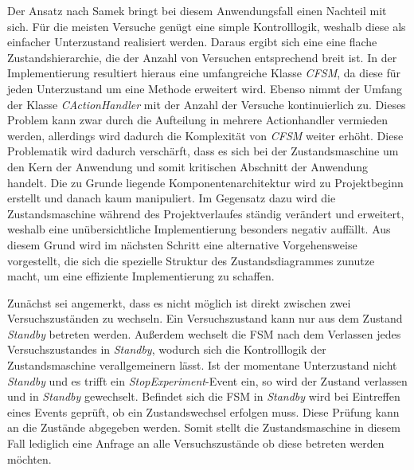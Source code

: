 Der Ansatz nach Samek bringt bei diesem Anwendungsfall einen Nachteil mit sich. Für die meisten Versuche genügt eine simple Kontrolllogik, weshalb diese als einfacher Unterzustand realisiert werden. Daraus ergibt sich eine eine flache Zustandshierarchie, die der Anzahl von Versuchen entsprechend breit ist. In der Implementierung resultiert hieraus eine umfangreiche Klasse \textit{CFSM}, da diese für jeden Unterzustand um eine Methode erweitert wird. Ebenso nimmt der Umfang der Klasse \textit{CActionHandler} mit der Anzahl der Versuche kontinuierlich zu. Dieses Problem kann zwar durch die Aufteilung in mehrere Actionhandler vermieden werden, allerdings wird dadurch die Komplexität von \textit{CFSM} weiter erhöht. Diese Problematik wird dadurch verschärft, dass es sich bei der Zustandsmaschine um den Kern der Anwendung und somit kritischen Abschnitt der Anwendung handelt. Die zu Grunde liegende Komponentenarchitektur wird zu Projektbeginn erstellt und danach kaum manipuliert. Im Gegensatz dazu wird die Zustandsmaschine während des Projektverlaufes ständig verändert und erweitert, weshalb eine unübersichtliche Implementierung besonders negativ auffällt. Aus diesem Grund wird im nächsten Schritt eine alternative Vorgehensweise vorgestellt, die sich die spezielle Struktur des Zustandsdiagrammes zunutze macht, um eine effiziente Implementierung zu schaffen.

Zunächst sei angemerkt, dass es nicht möglich ist direkt zwischen zwei Versuchszuständen zu wechseln. Ein Versuchszustand kann nur aus dem Zustand \textit{Standby} betreten werden. Außerdem wechselt die FSM nach dem Verlassen jedes Versuchszustandes in \textit{Standby}, wodurch sich die Kontrolllogik der Zustandsmaschine verallgemeinern lässt. Ist der momentane Unterzustand nicht \textit{Standby} und es trifft ein \textit{StopExperiment}-Event ein, so wird der Zustand verlassen und in \textit{Standby} gewechselt. Befindet sich die FSM in \textit{Standby} wird bei Eintreffen eines Events geprüft, ob ein Zustandswechsel erfolgen muss. Diese Prüfung kann an die Zustände abgegeben werden. Somit stellt die Zustandsmaschine in diesem Fall lediglich eine Anfrage an alle Versuchszustände ob diese betreten werden möchten.

